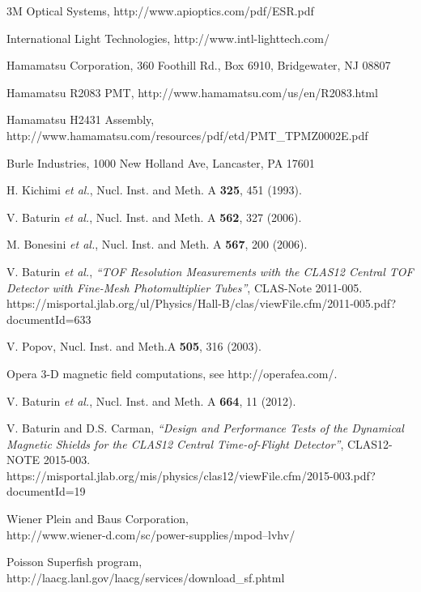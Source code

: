 \documentclass{elsart}
\begin{document}
\begin{thebibliography}{99}
3M Optical Systems, http://www.apioptics.com/pdf/ESR.pdf

International Light Technologies, http://www.intl-lighttech.com/

Hamamatsu Corporation, 360 Foothill Rd., Box 6910, Bridgewater, NJ 08807

Hamamatsu R2083 PMT, http://www.hamamatsu.com/us/en/R2083.html

Hamamatsu H2431 Assembly, \\
http://www.hamamatsu.com/resources/pdf/etd/PMT\_TPMZ0002E.pdf

Burle Industries, 1000 New Holland Ave, Lancaster, PA 17601

H. Kichimi {\it et al.}, Nucl. Inst. and Meth. A {\bf 325}, 451 (1993).

V. Baturin {\it et al.}, Nucl. Inst. and Meth. A {\bf 562}, 327 (2006).

M. Bonesini {\it et al.}, Nucl. Inst. and Meth. A {\bf 567}, 200 (2006).

V. Baturin {\it et al.}, {\it ``TOF Resolution Measurements with the CLAS12 Central TOF 
Detector with Fine-Mesh Photomultiplier Tubes''}, CLAS-Note 2011-005.\\
https://misportal.jlab.org/ul/Physics/Hall-B/clas/viewFile.cfm/2011-005.pdf?documentId=633

V. Popov, Nucl. Inst. and Meth.A {\bf 505}, 316 (2003).

Opera 3-D magnetic field computations, see http://operafea.com/.

V. Baturin {\it et al.}, Nucl. Inst. and Meth. A {\bf 664}, 11 (2012).

V. Baturin and D.S. Carman, {\it ``Design and Performance Tests of the Dynamical Magnetic Shields 
for the CLAS12 Central Time-of-Flight Detector''}, CLAS12-NOTE 2015-003.\\
https://misportal.jlab.org/mis/physics/clas12/viewFile.cfm/2015-003.pdf?documentId=19

Wiener Plein and Baus Corporation,\\
http://www.wiener-d.com/sc/power-supplies/mpod--lvhv/

Poisson Superfish program, \\
http://laacg.lanl.gov/laacg/services/download\_sf.phtml


\end{thebibliography}
\end{document}

